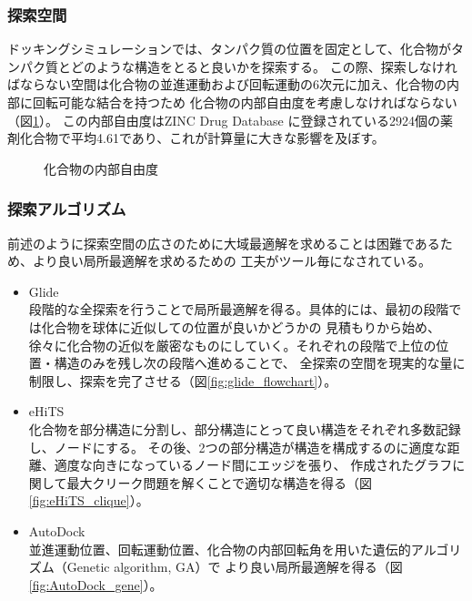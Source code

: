 \subsubsection{探索空間}
ドッキングシミュレーションでは、タンパク質の位置を固定として、化合物がタンパク質とどのような構造をとると良いかを探索する。
この際、探索しなければならない空間は化合物の並進運動および回転運動の6次元に加え、化合物の内部に回転可能な結合を持つため
化合物の内部自由度を考慮しなければならない（図\ref{fig:docking_freedom}）。
この内部自由度はZINC Drug Database に登録されている2924個の薬剤化合物で平均4.61であり、これが計算量に大きな影響を及ぼす。

\begin{figure}[tb]
 \begin{center}
  \caption{化合物の内部自由度}
  \label{fig:docking_freedom}
 \end{center}
\end{figure}


\subsubsection{探索アルゴリズム}
前述のように探索空間の広さのために大域最適解を求めることは困難であるため、より良い局所最適解を求めるための
工夫がツール毎になされている。
\begin{itemize}
\item Glide\\
	段階的な全探索を行うことで局所最適解を得る。具体的には、最初の段階では化合物を球体に近似しての位置が良いかどうかの
	見積もりから始め、徐々に化合物の近似を厳密なものにしていく。それぞれの段階で上位の位置・構造のみを残し次の段階へ進めることで、
	全探索の空間を現実的な量に制限し、探索を完了させる（図\ref{fig:glide_flowchart}）。
\item eHiTS\\
	化合物を部分構造に分割し、部分構造にとって良い構造をそれぞれ多数記録し、ノードにする。
	その後、2つの部分構造が構造を構成するのに適度な距離、適度な向きになっているノード間にエッジを張り、
	作成されたグラフに関して最大クリーク問題を解くことで適切な構造を得る（図\ref{fig:eHiTS_clique}）。
\item AutoDock\\
	並進運動位置、回転運動位置、化合物の内部回転角を用いた遺伝的アルゴリズム（Genetic algorithm, GA）で
	より良い局所最適解を得る（図\ref{fig:AutoDock_gene}）。
\end{itemize}

